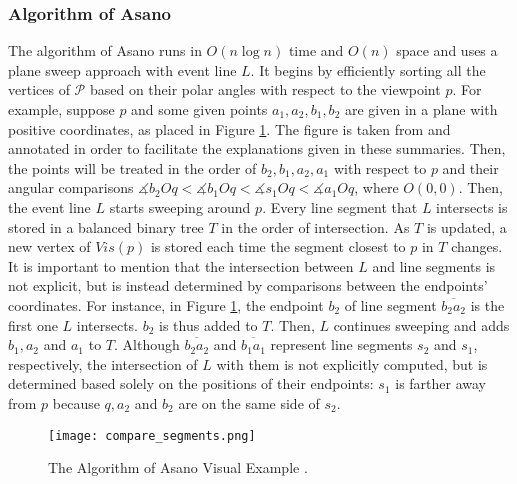 \subsubsection{Algorithm of Asano \cite{asano1985efficient}}
The algorithm of Asano \cite{asano1985efficient} runs in $O(n \log n)$ time and $O(n)$ space and uses a plane sweep approach with event line $L$. It begins by efficiently sorting all the vertices of $\mathcal P$ based on their polar angles with respect to the viewpoint $p$. For example, suppose $p$ and some given points $a_1, a_2, b_1, b_2$ are given in a plane with positive coordinates, as placed in Figure \ref{fig:asano}. The figure is taken from \cite{DBLP:journals/corr/BungiuHHHK14} and annotated in order to facilitate the explanations given in these summaries. Then, the points will be treated in the order of $b_2, b_1, a_2, a_1$ with respect to $p$ and their angular comparisons $\measuredangle b_2Oq < \measuredangle b_1Oq < \measuredangle s_1Oq < \measuredangle a_1Oq$, where $O(0, 0)$. Then, the event line $L$ starts sweeping around $p$. Every line segment that $L$ intersects is stored in a balanced binary tree $T$ in the order of intersection. As $T$ is updated, a new vertex of $Vis(p)$ is stored each time the segment closest to $p$ in $T$ changes. It is important to mention that the intersection between $L$ and line segments is not explicit, but is instead determined by comparisons between the endpoints' coordinates. For instance, in Figure \ref{fig:asano}, the endpoint $b_2$ of line segment $\overline{b_2a_2}$ is the first one $L$ intersects. $b_2$ is thus added to $T$. Then, $L$ continues sweeping and adds $b_1, a_2$ and $a_1$ to $T$. Although $\overline{b_2a_2}$ and $\overline{b_1a_1}$ represent line segments $s_2$ and $s_1$, respectively, the intersection of $L$ with them is not explicitly computed, but is determined based solely on the positions of their endpoints: $s_1$ is farther away from $p$ because $q, a_2$ and $b_2$ are on the same side of $s_2$.

\begin{figure}[h!]
	\centering
	\texttt{[image: compare\_segments.png]}
	\caption{The Algorithm of Asano \cite{asano1985efficient} Visual Example \cite{DBLP:journals/corr/BungiuHHHK14}.}
	\label{fig:asano}
\end{figure}

